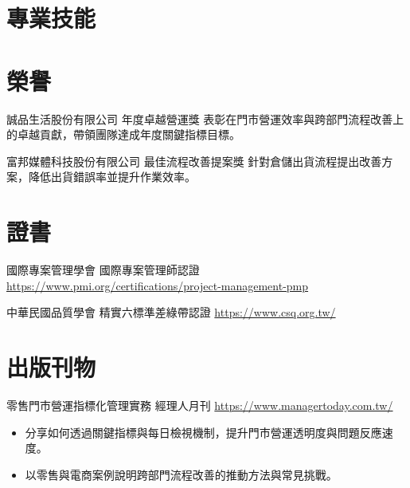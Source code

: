 \documentclass[a4paper, serif, 10pt]{moderncv}
\begin{document}
\section{專業技能}

\section{榮譽}

        {誠品生活股份有限公司}
        {年度卓越營運獎}
        {}
        {}
        {表彰在門市營運效率與跨部門流程改善上的卓越貢獻，帶領團隊達成年度關鍵指標目標。}

        {富邦媒體科技股份有限公司}
        {最佳流程改善提案獎}
        {}
        {}
        {針對倉儲出貨流程提出改善方案，降低出貨錯誤率並提升作業效率。}
\section{證書}

        {國際專案管理學會}
        {國際專案管理師認證}
        {\url{https://www.pmi.org/certifications/project-management-pmp}}
        {}
        {}

        {中華民國品質學會}
        {精實六標準差綠帶認證}
        {\url{https://www.csq.org.tw/}}
        {}
        {}
\section{出版刊物}

        {零售門市營運指標化管理實務}
        {經理人月刊}
        {\url{https://www.managertoday.com.tw/}}
        {}
        {\begin{itemize}
\item 分享如何透過關鍵指標與每日檢視機制，提升門市營運透明度與問題反應速度。
\item 以零售與電商案例說明跨部門流程改善的推動方法與常見挑戰。
\end{itemize}}
\end{document}
